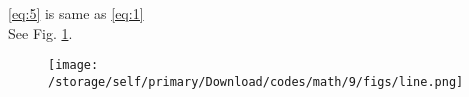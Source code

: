 \documentclass[12pt]{article}
\begin{document}
\begin{enumerate}
			\eqref{eq:5} is same as \eqref{eq:1}\\
		
See Fig.
\ref{fig:/storage/self/primary/Download/codes/math/9/figs/figure1}.
\begin{figure}[!h]
	\begin{center}
	\texttt{[image: /storage/self/primary/Download/codes/math/9/figs/line.png]}
	\end{center}
        \caption{}
        \label{fig:/storage/self/primary/Download/codes/math/9/figs/figure1}
 \end{figure}
\end{enumerate}
\end{document}
